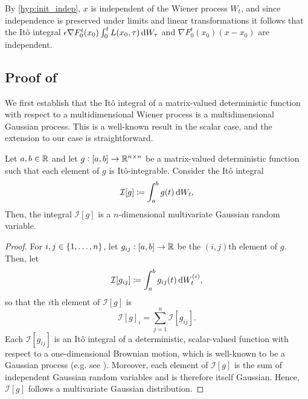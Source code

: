 By \ref{hyp:init_indep}, \(x\) is independent of the Wiener process \(W_t\), and since independence is preserved under limits and linear transformations it follows that the It\^o integral \(\epsilon \nabla F_0^t\!\left(x_0\right)\int_0^t{L\!\left(x_0, \tau\right)\dif W_\tau}\) and \(\nabla F_0^t\!\left(x_0\right)\left(x - x_0\right)\) are independent.


\subsection{Proof of }\label{app:limit_moments_proof}
We first establish that the It\^o integral of a matrix-valued deterministic function with respect to a multidimensional Wiener process is a multidimensional Gaussian process.
This is a well-known result in the scalar case, and the extension to our case is straightforward.
\begin{lemma}\label{lem:det_gauss}
	Let \(a,b \in \mathbb{R}\) and let \(g: [a,b] \to \mathbb{R}^{n\times n}\) be a matrix-valued deterministic function such that each element of \(g\) is It\^o-integrable.
	Consider the It\^o integral
	\[
		\mathcal{I}[g] \coloneqq \int_{a}^b{g(t)\dif W_t},
	\]
	Then, the integral \(\mathcal{I}[g]\) is a \(n\)-dimensional multivariate Gaussian random variable.
\end{lemma}
\begin{proof}
	For \(i,j \in \set{1,\hdots,n}\), let \(g_{ij}: [a,b] \to \mathbb{R}\) be the \((i,j)\)th element of \(g\).
	Then, let
	\[
		\mathcal{I}[g_{ij}] \coloneqq \int_a^b{g_{ij}(t)\dif W_t^{(i)}},
	\]
	so that the \(i\)th element of \(\mathcal{I}[g]\) is
	\[
		\mathcal{I}[g]_i = \sum_{j = 1}^n{\mathcal{I}\left[g_{ij}\right]}.
	\]
	Each \(\mathcal{I}[g_{ij}]\) is an It\^o integral of a deterministic, scalar-valued function with respect to a one-dimensional Brownian motion, which is well-known to be a Gaussian process (e.g. see \cite[Lem. 4.3.11]{Applebaum_2004_LevyProcessesStochastic}).
	Moreover, each element of \(\mathcal{I}[g]\) is the sum of independent Gaussian random variables and is therefore itself Gaussian.
	Hence, \(\mathcal{I}[g]\) follows a multivariate Gaussian distribution.
\end{proof}


